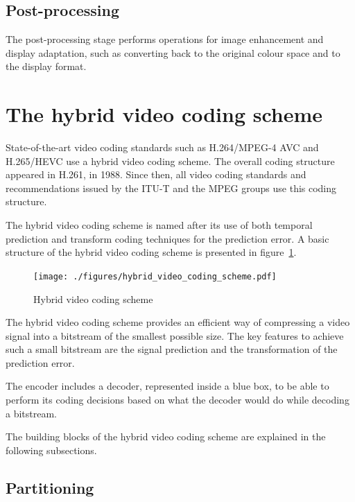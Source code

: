 \documentclass[11pt,a4paper,openright,twoside]{book}
\numberwithin{equation}{section} %
\numberwithin{figure}{section} %
\numberwithin{table}{section} %
\begin{document}
\subsection{Post-processing}
\label{sub:post_processing}

The post-processing stage performs operations for image enhancement and
display adaptation, such as converting back to the original colour
space and to the display format.

\section{The hybrid video coding scheme}
\label{sec:the_hybrid_video_coding_scheme}

State-of-the-art video coding standards such as H.264/\acs{MPEG}-4 \acs{AVC}
and H.265/\acs{HEVC} use a hybrid video coding scheme.
The overall coding structure appeared in H.261, in 1988.
Since then, all video coding standards and recommendations issued by the
\ac{ITU-T} and the \ac{MPEG} groups use this coding structure.

The hybrid video coding scheme is named after its use of both temporal
prediction and transform coding techniques for the prediction error.
A basic structure of the hybrid video coding scheme is presented in
figure~\ref{fig:hybrid_video_coding_scheme}.

\begin{figure}[tb]
	\centering
	\texttt{[image: ./figures/hybrid\_video\_coding\_scheme.pdf]}
	\caption{Hybrid video coding scheme}
	\label{fig:hybrid_video_coding_scheme}
\end{figure}

The hybrid video coding scheme provides an efficient way of compressing
a video signal into a bitstream of the smallest possible size.
The key features to achieve such a small bitstream are the signal
prediction and the transformation of the prediction error.

The encoder includes a decoder, represented inside a blue box, to be
able to perform its coding decisions based on what the decoder would do
while decoding a bitstream.

The building blocks of the hybrid video coding scheme are explained in
the following subsections.

\subsection{Partitioning}
\label{sub:partitioning}
\end{document}
